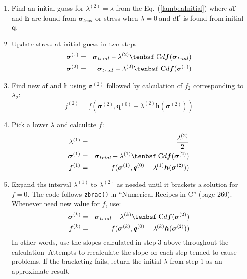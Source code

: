 \documentclass[11pt]{book}
\renewcommand{\vec}[1]{\boldsymbol{#1}}
\def\C{\hbox{\tenbsf C}}
\def\df{d \vec{f}}
\def\dfq{d \vec{f}^q}
\begin{document}
\begin{enumerate}

\item Find an initial guess for $\lambda^{(2)}=\lambda$ from the Eq.~(\ref{lambdaInitial}) where $\df$ and $\vec h$ are found from ${\vec\sigma_{trial}}$ or stress when $\lambda=0$ and $\dfq$ is found from initial $\vec q$.

\item Update stress at initial guess in two steps
\begin{eqnarray}
      {\vec\sigma}^{(1)} & = & {\vec\sigma_{trial}} - \lambda^{(2)}\C\df({\vec\sigma_{trial}}) \\
      {\vec\sigma}^{(2)} & = & {\vec\sigma_{trial}} - \lambda^{(2)}\C\df({\vec\sigma}^{(1)}) 
\end{eqnarray}

\item Find new $\df$ and $\vec h$ using ${\vec\sigma}^{(2)}$ followed by calculation of $f_2$ corresponding to $\lambda_2$:
\begin{equation}
     f^{(2)} =  f({\vec\sigma}^{(2)},\vec q^{(0)} - \lambda^{(2)} \vec h({\vec\sigma}^{(2)}))
\end{equation}

\item Pick a lower $\lambda$ and calculate $f$:
\begin{eqnarray}
     \lambda^{(1)} & = & {\lambda^{(2)}\over 2} \\
      {\vec\sigma}^{(1)} & = & {\vec\sigma_{trial}} - \lambda^{(1)}\C\df({\vec\sigma}^{(2)}) \\
     f^{(1)} & = &  f({\vec\sigma}^{(1)},\vec q^{(0)} - \lambda^{(1)} \vec h({\vec\sigma}^{(2)}))
\end{eqnarray}

\item Expand the interval $\lambda^{(1)}$ to $\lambda^{(2)}$ as needed until it brackets a solution for $f=0$. The code follows {\tt zbrac()} in ``Numerical Recipes in C'' (page 260). Whenever need new value for $f$, use:
\begin{eqnarray}
      {\vec\sigma}^{(k)} & = & {\vec\sigma_{trial}} - \lambda^{(k)}\C\df({\vec\sigma}^{(2)}) \\
     f^{(k)} & = &  f({\vec\sigma}^{(k)},\vec q^{(0)} - \lambda^{(k)} \vec h({\vec\sigma}^{(2)}))
\end{eqnarray}
In other words, use the slopes calculated in step 3 above throughout the calculation. Attempts to recalculate the slope on each step tended to cause problems. If the bracketing fails, return the initial $\lambda$ from step 1 as an approximate result.


\end{enumerate}
\end{document}
